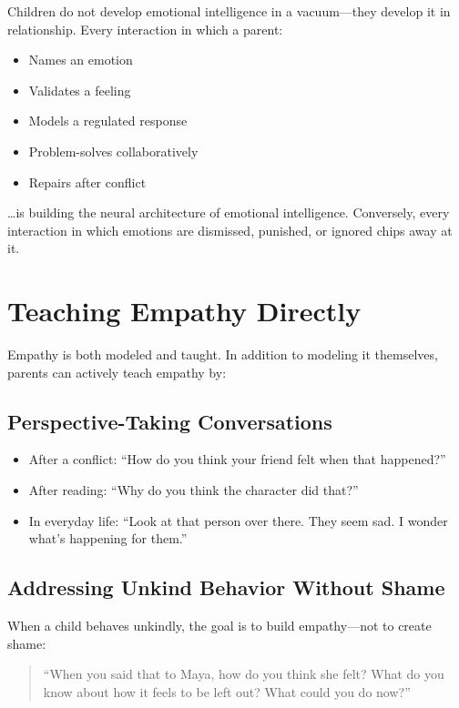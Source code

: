 Children do not develop emotional intelligence in a vacuum---they develop
it in relationship. Every interaction in which a parent:

\begin{itemize}
  \item Names an emotion
  \item Validates a feeling
  \item Models a regulated response
  \item Problem-solves collaboratively
  \item Repairs after conflict
\end{itemize}

\ldots is building the neural architecture of emotional intelligence.
Conversely, every interaction in which emotions are dismissed, punished,
or ignored chips away at it.

\section{Teaching Empathy Directly}

Empathy is both modeled and taught. In addition to modeling it themselves,
parents can actively teach empathy by:

\subsection{Perspective-Taking Conversations}

\begin{itemize}
  \item After a conflict: ``How do you think your friend felt when that
        happened?''
  \item After reading: ``Why do you think the character did that?''
  \item In everyday life: ``Look at that person over there. They seem
        sad. I wonder what's happening for them.''
\end{itemize}

\subsection{Addressing Unkind Behavior Without Shame}

When a child behaves unkindly, the goal is to build empathy---not
to create shame:

\begin{quote}
``When you said that to Maya, how do you think she felt? What do you
know about how it feels to be left out? What could you do now?''
\end{quote}

